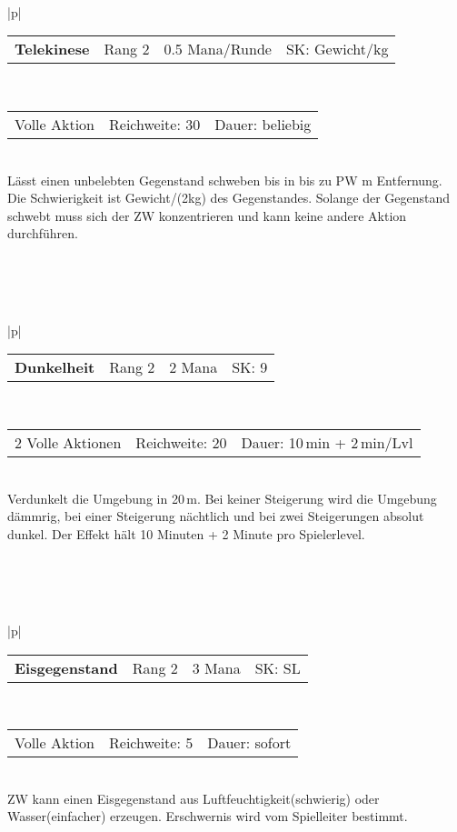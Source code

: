 \documentclass[../../Heldenanleitung2]{subfiles}
\begin{document}
\\\\\\
\begin{tabular}{|p{\textwidth}|}
\hline
\begin{tabularx}{\textwidth}{X|X|X|X}
\textbf{Telekinese} & Rang 2 & 0.5 Mana/Runde & SK: Gewicht/kg
\end{tabularx} \\ \hline
\begin{tabularx}{\textwidth}{X|X|X}
Volle Aktion & Reichweite: 30 & Dauer: beliebig
\end{tabularx} \\ \hline
Lässt einen unbelebten Gegenstand schweben bis in bis zu PW m Entfernung. Die Schwierigkeit ist Gewicht/(2kg) des Gegenstandes. Solange der Gegenstand schwebt muss sich der ZW konzentrieren und kann keine andere Aktion durchführen.
\\ \hline
\end{tabular}
\\\\\\
\begin{tabular}{|p{\textwidth}|}
\hline
\begin{tabularx}{\textwidth}{X|X|X|X}
\textbf{Dunkelheit} & Rang 2 & 2 Mana & SK: 9
\end{tabularx} \\ \hline
\begin{tabularx}{\textwidth}{X|X|X}
2 Volle Aktionen & Reichweite: 20 & Dauer: 10\,min + 2\,min/Lvl
\end{tabularx} \\ \hline
Verdunkelt die Umgebung in 20\,m. Bei keiner Steigerung wird die Umgebung dämmrig, bei einer Steigerung nächtlich und bei zwei Steigerungen absolut dunkel. Der Effekt hält 10 Minuten + 2 Minute pro Spielerlevel.
\\ \hline
\end{tabular}
\\\\\\
\begin{tabular}{|p{\textwidth}|}
\hline
\begin{tabularx}{\textwidth}{X|X|X|X}
\textbf{Eisgegenstand} & Rang 2 & 3 Mana & SK: SL
\end{tabularx} \\ \hline
\begin{tabularx}{\textwidth}{X|X|X}
Volle Aktion & Reichweite: 5 & Dauer: sofort
\end{tabularx} \\ \hline
ZW kann einen Eisgegenstand aus Luftfeuchtigkeit(schwierig) oder Wasser(einfacher) erzeugen. Erschwernis wird vom Spielleiter bestimmt.
\\ \hline
\end{tabular}
\end{document}
